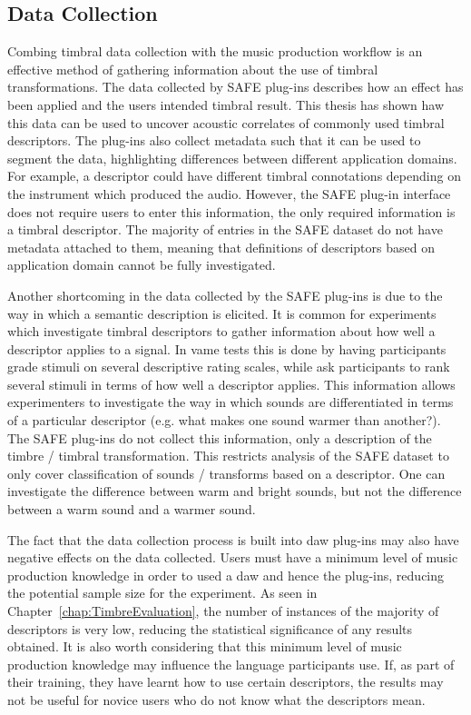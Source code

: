 	\subsection{Data Collection}
	\label{sec:Conclusion-Critique-DataCollection}
		Combing timbral data collection with the music production workflow is an effective method of gathering
		information about the use of timbral transformations. The data collected by SAFE plug-ins describes how an
		effect has been applied and the users intended timbral result. This thesis has shown haw this data can be
		used to uncover acoustic correlates of commonly used timbral descriptors. The plug-ins also collect metadata
		such that it can be used to segment the data, highlighting differences between different application
		domains. For example, a descriptor could have different timbral connotations depending on the instrument
		which produced the audio. However, the SAFE plug-in interface does not require users to enter this
		information, the only required information is a timbral descriptor. The majority of entries in the SAFE
		dataset do not have metadata attached to them, meaning that definitions of descriptors based on application
		domain cannot be fully investigated. 

		Another shortcoming in the data collected by the SAFE plug-ins is due to the way in which a semantic
		description is elicited. It is common for experiments which investigate timbral descriptors to gather
		information about how well a descriptor applies to a signal. In \acrshort{vame} tests this is done by having
		participants grade stimuli on several descriptive rating scales, while \citet{cartwright2013socialeq} ask
		participants to rank several stimuli in terms of how well a descriptor applies. This information allows
		experimenters to investigate the way in which sounds are differentiated in terms of a particular descriptor
		(e.g. what makes one sound warmer than another?). The SAFE plug-ins do not collect this information, only a
		description of the timbre / timbral transformation. This restricts analysis of the SAFE dataset to only
		cover classification of sounds / transforms based on a descriptor. One can investigate the difference
		between warm and bright sounds, but not the difference between a warm sound and a warmer sound.

		The fact that the data collection process is built into \acrshort{daw} plug-ins may also have negative
		effects on the data collected. Users must have a minimum level of music production knowledge in order to
		used a \acrshort{daw} and hence the plug-ins, reducing the potential sample size for the experiment. As seen
		in Chapter~\ref{chap:TimbreEvaluation}, the number of instances of the majority of descriptors is very low,
		reducing the statistical significance of any results obtained. It is also worth considering that this
		minimum level of music production knowledge may influence the language participants use. If, as part of
		their training, they have learnt how to use certain descriptors, the results may not be useful for novice
		users who do not know what the descriptors mean.

